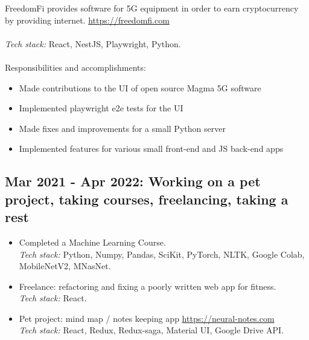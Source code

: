 \documentclass[a4paper, 14pt]{article}
\begin{document}
  FreedomFi provides software for 5G equipment in order to earn cryptocurrency by providing internet. \url{https://freedomfi.com} \\
  \\
  \textit{Tech stack:} React, NestJS, Playwright, Python. \\
  \\
  Responsibilities and accomplishments:
    \begin{itemize}
      \item Made contributions to the UI of open source Magma 5G software \\
      \item Implemented playwright e2e tests for the UI \\
      \item Made fixes and improvements for a small Python server \\
      \item Implemented features for various small front-end and JS back-end apps
    \end{itemize}

  \subsection{Mar 2021 - Apr 2022: Working on a pet project, taking courses, freelancing, taking a rest}

    \begin{itemize}
      \item Completed a Machine Learning Course. \\
      \textit{Tech stack:} Python, Numpy, Pandas, SciKit, PyTorch, NLTK, Google Colab, MobileNetV2, MNasNet. \\
      \item Freelance: refactoring and fixing a poorly written web app for fitness. \\
      \textit{Tech stack:} React. \\
      \item Pet project: mind map / notes keeping app \url{https://neural-notes.com} \\
      \textit{Tech stack:} React, Redux, Redux-saga, Material UI, Google Drive API.
    \end{itemize}
  \bigskip
\end{document}
